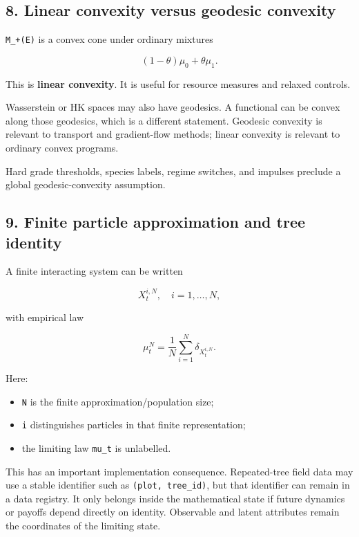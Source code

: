 \subsection{8. Linear convexity versus geodesic convexity}\label{linear-convexity-versus-geodesic-convexity}

\texttt{M\_+(E)} is a convex cone under ordinary mixtures

\[
(1-\theta)\mu_0+\theta\mu_1.
\]

This is \textbf{linear convexity}. It is useful for resource measures and relaxed
controls.

Wasserstein or HK spaces may also have geodesics. A functional can be convex
along those geodesics, which is a different statement. Geodesic convexity is
relevant to transport and gradient-flow methods; linear convexity is relevant to
ordinary convex programs.

Hard grade thresholds, species labels, regime switches, and impulses preclude a
global geodesic-convexity assumption.

\subsection{9. Finite particle approximation and tree identity}\label{finite-particle-approximation-and-tree-identity}

A finite interacting system can be written

\[
X_t^{i,N},\quad i=1,\ldots,N,
\]

with empirical law

\[
\mu_t^N=\frac1N\sum_{i=1}^N\delta_{X_t^{i,N}}.
\]

Here:

\begin{itemize}
\tightlist
\item
  \texttt{N} is the finite approximation/population size;
\item
  \texttt{i} distinguishes particles in that finite representation;
\item
  the limiting law \texttt{mu\_t} is unlabelled.
\end{itemize}

This has an important implementation consequence. Repeated-tree field data may
use a stable identifier such as \texttt{(plot,\ tree\_id)}, but that identifier can remain
in a data registry. It only belongs inside the mathematical state if future
dynamics or payoffs depend directly on identity. Observable and latent attributes
remain the coordinates of the limiting state.

